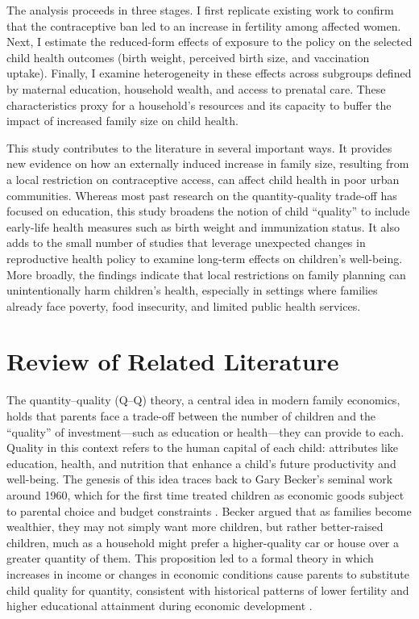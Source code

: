 \documentclass[]{AEA}
\begin{document}
The analysis proceeds in three stages. I first replicate existing work
\citep{dumas2019sex} to confirm that the contraceptive ban led to an
increase in fertility among affected women. Next, I estimate the
reduced-form effects of exposure to the policy on the selected child
health outcomes (birth weight, perceived birth size, and vaccination
uptake). Finally, I examine heterogeneity in these effects across
subgroups defined by maternal education, household wealth, and access to
prenatal care. These characteristics proxy for a household's resources
and its capacity to buffer the impact of increased family size on child
health.

This study contributes to the literature in several important ways. It
provides new evidence on how an externally induced increase in family
size, resulting from a local restriction on contraceptive access, can
affect child health in poor urban communities. Whereas most past
research on the quantity-quality trade-off has focused on education,
this study broadens the notion of child ``quality'' to include
early-life health measures such as birth weight and immunization status.
It also adds to the small number of studies that leverage unexpected
changes in reproductive health policy to examine long-term effects on
children's well-being. More broadly, the findings indicate that local
restrictions on family planning can unintentionally harm children's
health, especially in settings where families already face poverty, food
insecurity, and limited public health services.

\section{Review of Related Literature}

The quantity--quality (Q--Q) theory, a central idea in modern family
economics, holds that parents face a trade-off between the number of
children and the ``quality'' of investment---such as education or
health---they can provide to each. Quality in this context refers to the
human capital of each child: attributes like education, health, and
nutrition that enhance a child's future productivity and well-being. The
genesis of this idea traces back to Gary Becker's seminal work around
1960, which for the first time treated children as economic goods
subject to parental choice and budget constraints
\citep{becker1960economic}. Becker argued that as families become
wealthier, they may not simply want more children, but rather
better-raised children, much as a household might prefer a
higher-quality car or house over a greater quantity of them. This
proposition led to a formal theory in which increases in income or
changes in economic conditions cause parents to substitute child quality
for quantity, consistent with historical patterns of lower fertility and
higher educational attainment during economic development
\citep{galor2000population}.
\end{document}
